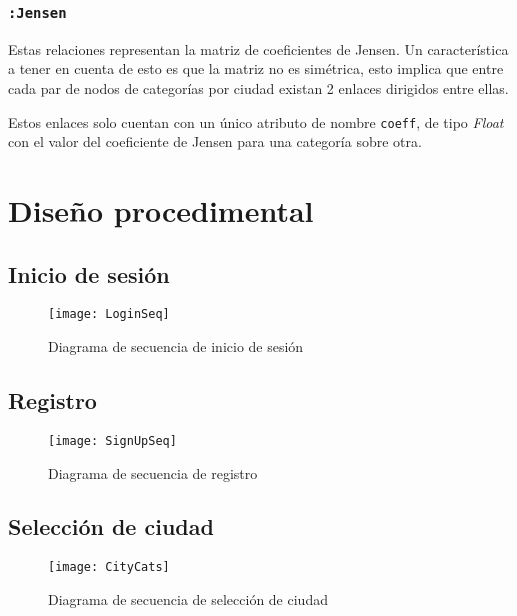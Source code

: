 \subsubsection{\texttt{:Jensen}}
Estas relaciones representan la matriz de coeficientes de Jensen. Un característica a tener en cuenta de esto es que la matriz no es simétrica, esto implica que entre cada par de nodos de categorías por ciudad existan 2 enlaces dirigidos entre ellas.

Estos enlaces solo cuentan con un único atributo de nombre \texttt{coeff}, de tipo \textit{Float} con el valor del coeficiente de Jensen para una categoría sobre otra.

\section{Diseño procedimental}

\newpage
\subsection{Inicio de sesión}
\begin{figure}[!h]
	\centering
	\texttt{[image: LoginSeq]}
	\caption{Diagrama de secuencia de inicio de sesión}\label{LoginSeq}
\end{figure}
\FloatBarrier

\newpage

\subsection{Registro}

	\begin{figure}[!h]
		\centering
		\texttt{[image: SignUpSeq]}
		\caption{Diagrama de secuencia de registro}\label{SignUpSeq}
	\end{figure}
	\FloatBarrier

\newpage



\begin{landscape}
	\subsection{Selección de ciudad}
	\begin{figure}[!h]
		\centering
		\texttt{[image: CityCats]}
		\caption{Diagrama de secuencia de selección de ciudad}\label{CityCats}
	\end{figure}
	\FloatBarrier
\end{landscape}

